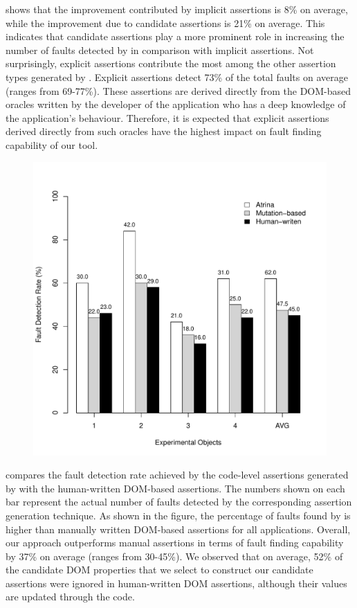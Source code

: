  shows that the improvement contributed by implicit assertions is 8\% on average, while the improvement due to candidate assertions is 21\% on average. This indicates that candidate assertions play a more prominent role in increasing the number of faults detected by \tool in comparison with implicit assertions. Not surprisingly, explicit assertions contribute the most among the other assertion types generated by \tool. Explicit assertions detect 73\% of the total faults on average (ranges from 69-77\%). These assertions are derived directly from the DOM-based oracles written by the developer of the application who has a deep knowledge of the application's behaviour. Therefore, it is expected that explicit assertions derived directly from such oracles have the highest impact on fault finding capability of our tool.        
\begin{figure}[!t]
  \centering
  \includegraphics[width=1\hsize]{r-scripts/barplot-faultDetectionRate}
  \vspace{-0.18in}   
  \vspace{-0.1in} 
  \label{Fig:barplot-faultDetectionRate}
\end{figure}
 compares the fault detection rate achieved by the code-level assertions generated by \tool with the human-written DOM-based assertions. The numbers shown on each bar represent the actual number of faults detected by the corresponding assertion generation technique. As shown in the figure, the percentage of faults found by \tool is higher than manually written DOM-based assertions for all applications. Overall, our approach outperforms manual assertions in terms of fault finding capability by 37\% on average (ranges from 30-45\%). We observed that on average, 52\% of the candidate DOM properties that we select to construct our candidate assertions were ignored in human-written DOM assertions, although their values are updated through the \javascript code.
